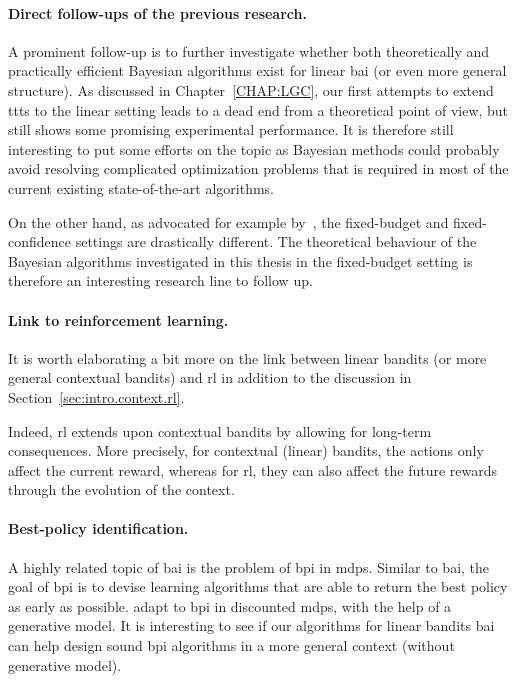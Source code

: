 \paragraph{Direct follow-ups of the previous research.} 
A prominent follow-up is to further investigate whether both theoretically and practically efficient Bayesian algorithms exist for linear \gls{bai} (or even more general structure). As discussed in Chapter~\ref{CHAP:LGC}, our first attempts to extend \gls{ttts} to the linear setting leads to a dead end from a theoretical point of view, but still shows some promising experimental performance. It is therefore still interesting to put some efforts on the topic as Bayesian methods could probably avoid resolving complicated optimization problems that is required in most of the current existing state-of-the-art algorithms.

On the other hand, as advocated for example by~\cite{locatelli2016thresholding}, the fixed-budget and fixed-confidence settings are drastically different. The theoretical behaviour of the Bayesian algorithms investigated in this thesis in the fixed-budget setting is therefore an interesting research line to follow up.

\paragraph{Link to reinforcement learning.}
It is worth elaborating a bit more on the link between linear bandits (or more general contextual bandits) and \gls{rl} in addition to the discussion in Section~\ref{sec:intro.context.rl}.

Indeed, \gls{rl} extends upon contextual bandits by allowing for long-term consequences. More precisely, for contextual (linear) bandits, the actions only affect the current reward, whereas for \gls{rl}, they can also affect the future rewards through the evolution of the context.

\paragraph{Best-policy identification.}

A highly related topic of \gls{bai} is the problem of \gls{bpi} in \gls{mdp}s. Similar to \gls{bai}, the goal of \gls{bpi} is to devise learning algorithms that are able to return the best policy as early as possible. \cite{marjani2020bpi} adapt \Track to \gls{bpi} in discounted \gls{mdp}s, with the help of a generative model. It is interesting to see if our algorithms for linear bandits \gls{bai} can help design sound \gls{bpi} algorithms in a more general context (without generative model).
